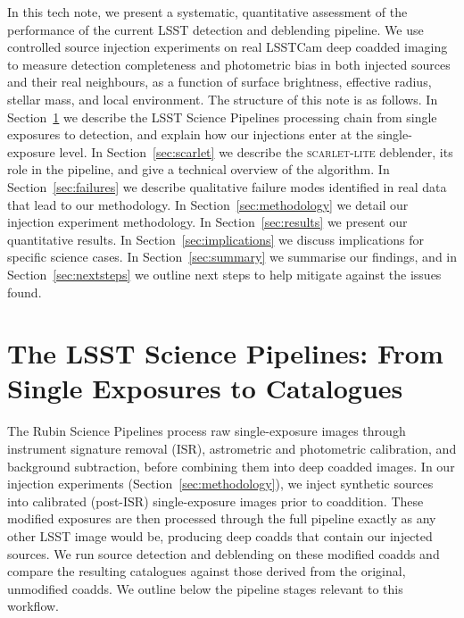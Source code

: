 \documentclass[DM,lsstdraft,authoryear,toc]{lsstdoc}
\newcommand{\scarletlite}{\textsc{scarlet-lite}\xspace}
\begin{document}
In this tech note, we present a systematic, quantitative assessment of the
performance of the current LSST detection and deblending pipeline. We use
controlled source injection experiments on real LSSTCam deep coadded imaging
to measure detection completeness and photometric bias in both injected sources and their real neighbours, 
as a function of surface brightness, effective radius, stellar mass, and local environment.
The structure of this note is as follows. In Section~\ref{sec:pipelines} we
describe the LSST Science Pipelines processing chain from single exposures to
detection, and explain how our injections enter at the
single-exposure level. In Section~\ref{sec:scarlet} we describe the
\scarletlite deblender, its role in the pipeline, and give a technical
overview of the algorithm. In Section~\ref{sec:failures} we
describe qualitative failure modes identified in real data that lead to our methodology. In
Section~\ref{sec:methodology} we detail our injection experiment methodology.
In Section~\ref{sec:results} we present our quantitative results. In
Section~\ref{sec:implications} we discuss implications for specific science
cases. In Section~\ref{sec:summary} we summarise our findings, and in
Section~\ref{sec:nextsteps} we outline next steps to help mitigate against the issues found.


\section{The LSST Science Pipelines: From Single Exposures to Catalogues}
\label{sec:pipelines}

The Rubin Science Pipelines \citep{Bosch2018,Bosch2019} process raw
single-exposure images through instrument signature removal (ISR), astrometric
and photometric calibration, and background subtraction, before combining
them into deep coadded images. In our injection experiments
(Section~\ref{sec:methodology}), we inject synthetic sources into calibrated (post-ISR)
single-exposure images prior to coaddition. These modified exposures are then
processed through the full pipeline exactly as any other LSST image would be,
producing deep coadds that contain our injected sources. We run source
detection and deblending on these modified coadds and compare the resulting
catalogues against those derived from the original, unmodified coadds. We
outline below the pipeline stages relevant to this workflow.
\end{document}

